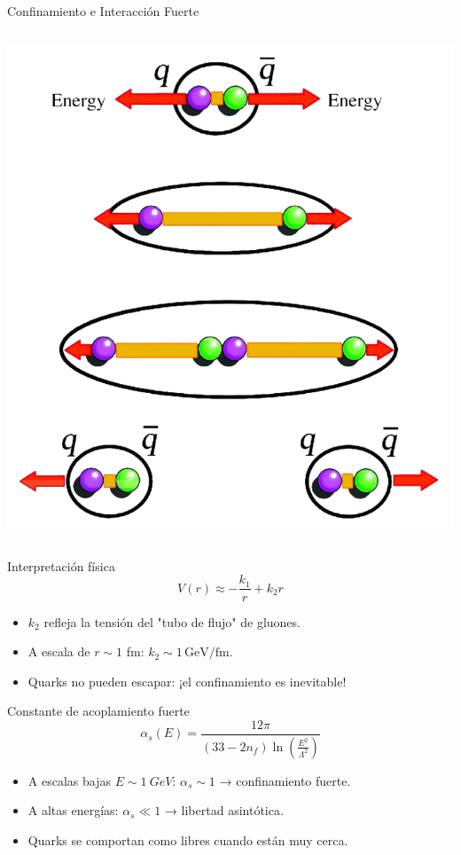 \documentclass{beamer}
\begin{document}
\begin{frame}{Confinamiento e Interacción Fuerte}
\begin{columns}
    \centering
    \includegraphics[width=\linewidth]{figures/confinamiento.png}
  
  \end{columns}
  \end{frame}

\begin{frame}{Interpretación física}
\begin{equation*}
V(r) \approx -\frac{k_1}{r} + k_2 r
\end{equation*}
\begin{itemize}
  \item \(k_2\) refleja la tensión del "tubo de flujo" de gluones.
  \item A escala de \(r \sim 1\) fm: \(k_2 \sim 1\,\mathrm{GeV/fm}\).
  \item Quarks no pueden escapar: ¡el confinamiento es inevitable!
\end{itemize}
\end{frame}

\begin{frame}{Constante de acoplamiento fuerte}
\begin{equation*}
\alpha_s(E) = \frac{12\pi}{(33 - 2n_f)\ln\left(\frac{E^2}{\Lambda^2}\right)}
\end{equation*}
\begin{itemize}
  \item A escalas bajas \( E \sim \SI{1}{GeV} \): \( \alpha_s \sim 1 \) → confinamiento fuerte.
  \item A altas energías: \( \alpha_s \ll 1 \) → libertad asintótica.
  \item Quarks se comportan como libres cuando están muy cerca.
\end{itemize}
\end{frame}
\end{document}
